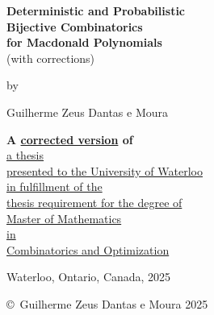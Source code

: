 \pagestyle{empty}

\begin{titlepage}
  \begin{center}

    \Huge
    {\bf Deterministic and Probabilistic \\ Bijective Combinatorics \\ for Macdonald Polynomials} \\
    (with corrections)

    \vspace*{1.0cm}

    \normalsize
    by \\

    \vspace*{1.0cm}

    \Large
    Guilherme Zeus Dantas e Moura \\

    \vspace*{3.0cm}

    \normalsize
    \textbf{A \href{https://github.com/ZeusDM/mmath-thesis/tree/main}{corrected version} of} \\
    \href{https://uwspace.uwaterloo.ca/handle/10012/22733}{a thesis \\
    presented to the University of Waterloo \\
    in fulfillment of the \\
    thesis requirement for the degree of \\
    Master of Mathematics \\
    in \\
    Combinatorics and Optimization} \\

    \vspace*{2.0cm}

    Waterloo, Ontario, Canada, 2025 \\

    \vspace*{1.0cm}

    \copyright\ Guilherme Zeus Dantas e Moura 2025 \\
  \end{center}
\end{titlepage}

\pagestyle{plain}
\setcounter{page}{2}

% 
\clearpage
{}

